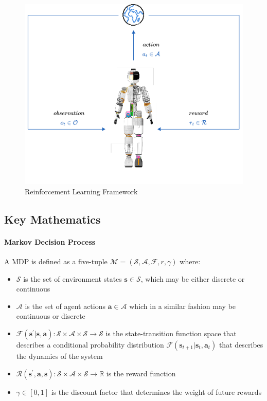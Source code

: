 \begin{figure}
    \centering
    \caption{Reinforcement Learning Framework}
    \label{fig:rlframework}
    \includegraphics[width=.7\textwidth]{Images/rl_ergocub.png}
\end{figure}

\subsection{Key Mathematics}

\paragraph{Markov Decision Process} A \ac{MDP} is defined as a five-tuple $\mathcal{M} = (\mathcal{S}, \mathcal{A}, \mathcal{F}, r, \gamma)$ where:

\begin{itemize}
    \item $\mathcal{S}$ is the set of environment states $\mathbf{s} \in \mathcal{S}$, which may be either discrete or continuous
    \item $\mathcal{A}$ is the set of agent actions $\mathbf{a} \in \mathcal{A}$ which in a similar fashion may be continuous or discrete
    \item $\mathcal{F} (\mathbf{s}^\prime | \mathbf{s}, \mathbf{a}): \mathcal{S} \times \mathcal{A} \times \mathcal{S} \rightarrow \mathcal{S}$ is the state-transition function space that describes a conditional probability distribution $\mathcal{F}(\mathbf{s} _{t+1}|\mathbf{s}_t, \mathbf{a} _t)$ that describes the dynamics of the system
    \item $\mathcal{R} (\mathbf{s}^\prime, \mathbf{a}, \mathbf{s}): \mathcal{S} \times \mathcal{A} \times \mathcal{S} \rightarrow \mathbb{R}$ is the reward function
    \item $\gamma \in [0,1]$ is the discount factor that determines the weight of future rewards
\end{itemize}

